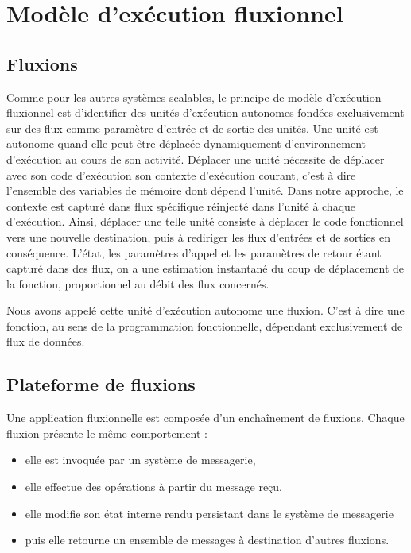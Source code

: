 \section{Modèle d'exécution fluxionnel}

\subsection{Fluxions}

Comme pour les autres systèmes scalables, le principe de modèle d'exécution
fluxionnel est d'identifier des unités
d'exécution autonomes fondées exclusivement sur des flux comme paramètre
d'entrée et de sortie des unités.  Une unité est autonome quand
elle peut être déplacée dynamiquement d'environnement d'exécution au cours
de son activité.  Déplacer une unité nécessite de déplacer
avec son code d'exécution son contexte d'exécution courant, c'est à dire l'ensemble des
variables de mémoire dont dépend l'unité. Dans notre approche, le contexte est
capturé dans flux spécifique réinjecté dans l'unité à chaque d'exécution. 
Ainsi, déplacer une telle unité consiste à déplacer le code fonctionnel
vers une nouvelle destination, puis à rediriger les flux d'entrées et de
sorties en conséquence. L'état, les paramètres d'appel et les paramètres
de retour étant capturé dans des flux, on a une estimation instantané du coup
de déplacement de la fonction, proportionnel au débit des flux concernés. 

Nous avons appelé cette unité d'exécution autonome une fluxion. C'est à
dire une fonction, au sens de la programmation fonctionnelle, dépendant
exclusivement de flux de données.

\subsection{Plateforme de fluxions}

Une application fluxionnelle est composée d'un enchaînement de fluxions.
Chaque fluxion présente le même comportement :
\begin{itemize}
  \item elle est invoquée par un système de messagerie,
  \item elle effectue des opérations à partir du message reçu,
  \item elle modifie son état interne rendu persistant dans le système de messagerie
  \item puis elle retourne un ensemble de messages à destination d'autres
    fluxions.
\end{itemize}

